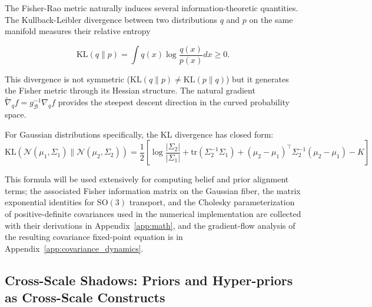 \documentclass[11pt]{article}
\begin{document}
The Fisher-Rao metric naturally induces several information-theoretic quantities. The Kullback-Leibler divergence between two distributions $q$ and $p$ on the same manifold measures their relative entropy

\begin{equation}
\mathrm{KL}(q \| p) = \int q(x) \log\frac{q(x)}{p(x)} dx \geq 0.
\end{equation}

This divergence is not symmetric ($\mathrm{KL}(q \| p) \neq \mathrm{KL}(p \| q)$) but it generates the Fisher metric through its Hessian structure. The natural gradient $\tilde{\nabla}_q f = g^{-1}_{\mathcal{B}} \nabla_q f$ provides the steepest descent direction in the curved probability space.

For Gaussian distributions specifically, the KL divergence has closed form:
\begin{equation}
\mathrm{KL}(\mathcal{N}(\mu_1, \Sigma_1) \| \mathcal{N}(\mu_2, \Sigma_2)) = \frac{1}{2}\left[\log\frac{|\Sigma_2|}{|\Sigma_1|} + \mathrm{tr}(\Sigma_2^{-1}\Sigma_1) + (\mu_2 - \mu_1)^\top\Sigma_2^{-1}(\mu_2 - \mu_1) - K\right]
\label{eq:gaussian_kl}
\end{equation}

This formula will be used extensively for computing belief and prior alignment terms; the associated Fisher information matrix on the Gaussian fiber, the matrix exponential identities for $\mathrm{SO}(3)$ transport, and the Cholesky parameterization of positive-definite covariances used in the numerical implementation are collected with their derivations in Appendix~\ref{app:math}, and the gradient-flow analysis of the resulting covariance fixed-point equation is in Appendix~\ref{app:covariance_dynamics}.

\subsection{Cross-Scale Shadows: Priors and Hyper-priors as Cross-Scale Constructs}
\label{sec:cross_scale_shadows}
\end{document}
